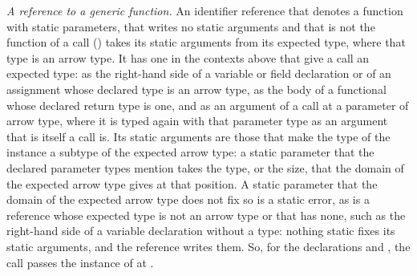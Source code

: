 \emph{A reference to a generic function.}
An identifier reference that denotes a function with static parameters, that
writes no static arguments and that is not the function of a call
() takes its static arguments from its expected type, where
that type is an arrow type.
It has one in the contexts above that give a call an expected type: as the
right-hand side of a variable or field declaration or of an assignment whose
declared type is an arrow type, as the body of a functional whose declared
return type is one, and as an argument of a call at a parameter of arrow
type, where it is typed again with that parameter type as an argument that is
itself a call is.
Its static arguments are those that make the type of the instance a subtype of
the expected arrow type: a static parameter that the declared parameter types
mention takes the type, or the size, that the domain of the expected arrow
type gives at that position.
A static parameter that the domain of the expected arrow type does not fix so
is a static error, as is a reference whose expected type is not an arrow type
or that has none, such as the right-hand side of a variable declaration
without a type: nothing static fixes its static arguments, and the reference
writes them.
So, for the declarations
and
,
the call  passes the instance of 
at .

